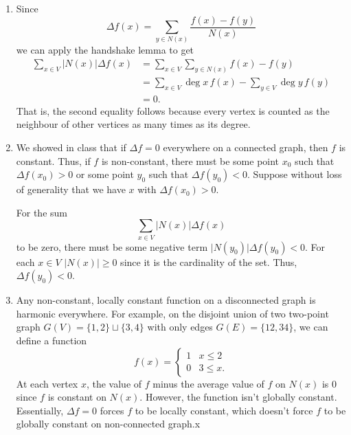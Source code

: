 \documentclass[12 pt, letterpaper]{hmcpset}
\begin{document}
\begin{solution}
	\begin{enumerate}
		\item Since
			 \[
				\Delta f(x) = \sum_{y \in N(x)} \frac{f(x) - f(y)}{N(x)}
			\]
			we can apply the handshake lemma to get
			\begin{align*}
				\sum_{x \in V} \lvert N(x) \rvert \Delta f(x) & = \sum_{x \in V} \sum_{y \in N(x)} f(x) - f(y) \\
									      & = \sum_{x \in V} \operatorname{deg} x \, f(x) - \sum_{y \in V} \deg y \, f(y) \\
									      & = 0.
			\end{align*}
			That is, the second equality follows because every vertex is counted as the neighbour of other vertices as many times as its degree.

		\item We showed in class that if $\Delta f = 0$ everywhere on a connected graph, then $f$ is constant. Thus, if $f$ is non-constant, there must be some point $x_{0}$ such that $\Delta f(x_{0}) > 0$ or some point $y_{0}$ such that $\Delta f(y_{0}) < 0$. Suppose without loss of generality that we have $x$ with $\Delta f(x_{0}) > 0$.

			For the sum
			\[
				\sum_{x \in V} \lvert N(x) \rvert \Delta f(x)
			\]
			to be zero, there must be some negative term $\lvert N(y_{0}) \rvert \Delta f(y_{0}) < 0$. For each $x \in V$ $\lvert N(x) \rvert \ge 0$ since it is the cardinality of the set. Thus, $\Delta f(y_{0}) < 0$.

		\item Any non-constant, locally constant function on a disconnected graph is harmonic everywhere. For example, on the disjoint union of two two-point graph $G(V) = \{ 1, 2 \} \sqcup \{ 3, 4 \}$ with only edges $G(E) = \{ 12, 34 \}$, we can define a function
			\[
				f(x) = \begin{cases}
					1 & x \le 2 \\
					0 & 3 \le x.
				\end{cases}
			\]
			At each vertex $x$, the value of $f$ minus the average value of $f$ on $N(x)$ is $0$ since $f$ is constant on $N(x)$. However, the function isn't globally constant. Essentially, $\Delta f = 0$ forces $f$ to be locally constant, which doesn't force $f$ to be globally constant on non-connected graph.x
	\end{enumerate}
\end{solution}

\pagebreak
\end{document}
